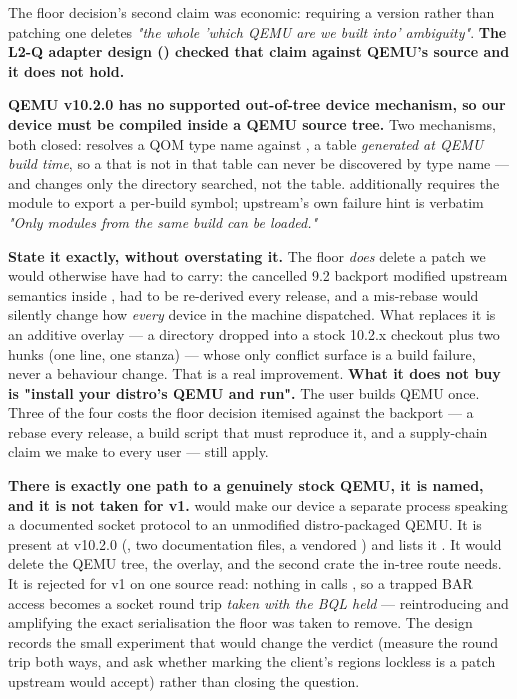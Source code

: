 \documentclass[10.5pt]{article}
\begin{document}
The floor decision's second claim was economic: requiring a version rather than patching one
deletes \emph{"the whole 'which QEMU are we built into' ambiguity"}. \textbf{The L2-Q adapter
design () checked that claim against QEMU's source and it does not hold.}

\begin{warnbox}\small
\textbf{QEMU v10.2.0 has no supported out-of-tree device mechanism, so our device must be
compiled inside a QEMU source tree.} Two mechanisms, both closed:
 resolves a QOM type name against , a table
\emph{generated at QEMU build time}, so a  that is not in that table can never be
discovered by type name — and  changes only the directory searched, not
the table.  additionally requires the module to export a per-build
 symbol; upstream's own failure hint is verbatim \emph{"Only modules from the
same build can be loaded."}
\hfill {}
\end{warnbox}

\textbf{State it exactly, without overstating it.} The floor \emph{does} delete a patch we would
otherwise have had to carry: the cancelled 9.2 backport modified upstream semantics inside
, had to be re-derived every release, and a mis-rebase would silently
change how \emph{every} device in the machine dispatched. What replaces it is an additive
overlay — a directory dropped into a stock 10.2.x checkout plus two hunks (one 
line, one  stanza) — whose only conflict surface is a build failure, never a
behaviour change. That is a real improvement. \textbf{What it does not buy is "install your
distro's QEMU and run".} The user builds QEMU once. Three of the four costs the floor decision
itemised against the backport — a rebase every release, a build script that must reproduce it,
and a supply-chain claim we make to every user — still apply.

\textbf{There is exactly one path to a genuinely stock QEMU, it is named, and it is not taken for
v1.}  would make our device a separate process speaking a documented socket
protocol to an unmodified distro-packaged QEMU. It is present at v10.2.0
(, two documentation files, a vendored ) and
 lists it . It would delete the QEMU tree, the overlay, and
the second  crate the in-tree route needs. It is rejected for v1 on one source read:
nothing in  calls , so a trapped BAR
access becomes a socket round trip \emph{taken with the BQL held} — reintroducing and amplifying
the exact serialisation the floor was taken to remove. The design records the small experiment
that would change the verdict (measure the round trip both ways, and ask whether marking the
client's regions lockless is a patch upstream would accept) rather than closing the question.
\end{document}
